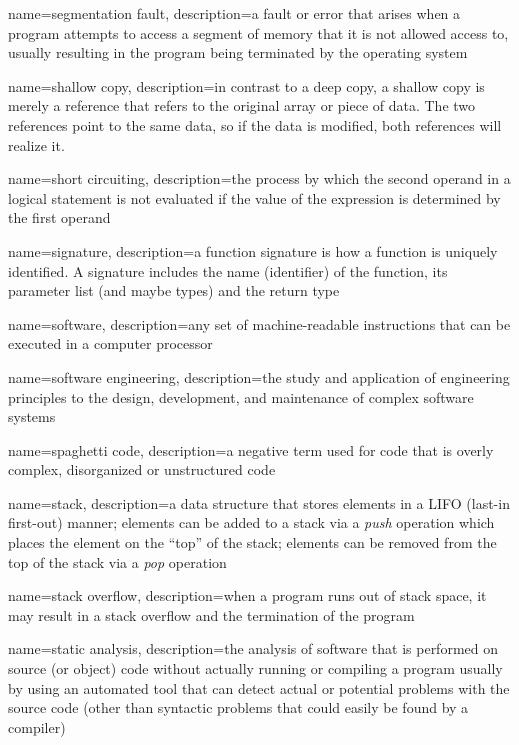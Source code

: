{
  name=segmentation fault,
  description={a fault or error that arises when a program attempts to access a segment of memory that it is not allowed access to, usually resulting in the program being terminated by the operating system}
}

{
  name=shallow copy,
  description={in contrast to a deep copy, a shallow copy is merely a reference that refers to the original array or piece of data.  The two references point to the same data, so if the data is modified, both references will realize it.}
}

{
  name=short circuiting,
  description={the process by which the second operand in a logical statement is not evaluated if the
  	value of the expression is determined by the first operand}
}

{
  name=signature,
  description={a function signature is how a function is uniquely identified.  A signature includes the name (identifier) of the function, its parameter list (and maybe types) and the return type}
}

{
  name=software,
  description={any set of machine-readable instructions that can be executed in a computer processor}
}

{
  name=software engineering,
  description={the study and application of engineering principles to the design, development, and maintenance of complex software systems}
}

{
  name=spaghetti code,
  description={a negative term used for code that is overly complex, disorganized or unstructured code}
}

{
  name=stack,
  description={a data structure that stores elements in a LIFO (last-in first-out) manner; elements can be added to a stack via a \emph{push} operation which places the element on the ``top'' of the stack; elements can be removed from the top of the stack via a \emph{pop} operation}
}

{
  name=stack overflow,
  description={when a program runs out of stack space, it may result in a stack overflow and the termination of the program}
}

{
  name=static analysis,
  description={the analysis of software that is performed on source (or object) code without actually running or compiling a program usually by using an automated tool that can detect actual or potential problems with the source code (other than syntactic problems that could easily be found by a compiler)}
}

